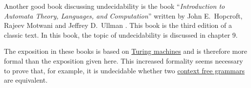 Another good book discussing undecidability is the book 
``\emph{Introduction to Automata Theory, Languages, and Computation}'' written by John E.~Hopcroft,
Rajeev Motwani and Jeffrey D.~Ullman \cite{hopcroft:06}.  This book is the third edition of a
classic text.  In this book, the topic of undecidability is discussed in chapter 9.

The exposition in these books is based on
\href{https://en.wikipedia.org/wiki/Turing_machine}{Turing machines} and is therefore more formal than the
exposition given here.  This increased formality seems necessary to prove that, for example, it is undecidable
whether two \href{https://en.wikipedia.org/wiki/Context-free_grammar}{context free grammars} are equivalent.






